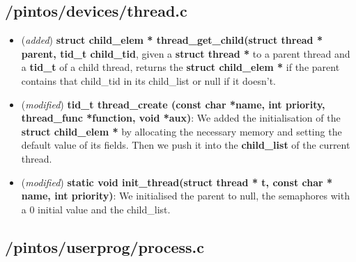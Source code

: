 \documentclass[11pt]{scrartcl}
\begin{document}
\subsection*{/pintos/devices/thread.c}

\begin{itemize}
    \item (\textit{added}) \textbf{struct child\_elem * thread\_get\_child(struct thread * parent, tid\_t child\_tid}, given a \textbf{struct thread *} to a parent thread and a \textbf{tid\_t} of a child thread, returns the \textbf{struct child\_elem *} if the parent contains that child\_tid in its child\_list or null if it doesn't.

    \item (\textit{modified}) \textbf{tid\_t thread\_create (const char *name, int priority, thread\_func *function, void *aux)}:
          We added the initialisation of the \textbf{struct child\_elem *} by allocating the necessary memory and setting the default value of its fields. Then we push it into the \textbf{child\_list} of the current thread.
    \item (\textit{modified}) \textbf{static void init\_thread(struct thread * t, const char * name, int priority)}: We initialised the parent to null, the semaphores with a 0 initial value and the child\_list.
\end{itemize}

\subsection*{/pintos/userprog/process.c}
\end{document}

